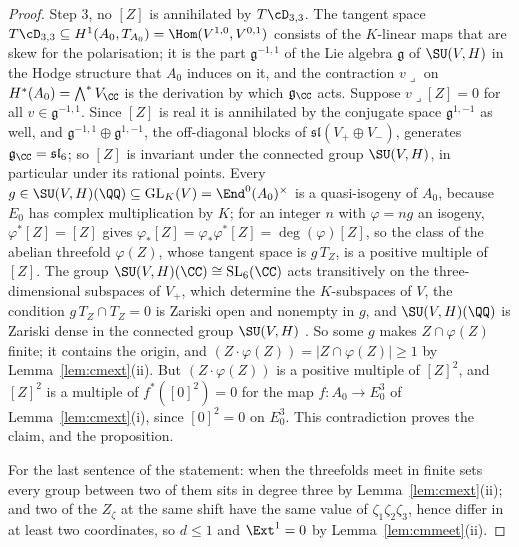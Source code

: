 \begin{proof}
Step 3, no $[Z]$ is annihilated by $T\cD_{3,3}$. The tangent space $T\cD_{3,3}\subseteq H^{1}(A_{0},T_{A_{0}})=\Hom(V^{1,0},V^{0,1})$ consists of the $K$-linear maps that are skew for the polarisation; it is the part $\mathfrak{g}^{-1,1}$ of the Lie algebra $\mathfrak{g}$ of $\SU(V,H)$ in the Hodge structure that $A_{0}$ induces on it, and the contraction $v\lrcorner$ on $H^{*}(A_{0})=\bigwedge^{*}V_{\CC}$ is the derivation by which $\mathfrak{g}_{\CC}$ acts. Suppose $v\lrcorner[Z]=0$ for all $v\in\mathfrak{g}^{-1,1}$. Since $[Z]$ is real it is annihilated by the conjugate space $\mathfrak{g}^{1,-1}$ as well, and $\mathfrak{g}^{-1,1}\oplus\mathfrak{g}^{1,-1}$, the off-diagonal blocks of $\mathfrak{sl}(V_{+}\oplus V_{-})$, generates $\mathfrak{g}_{\CC}=\mathfrak{sl}_{6}$; so $[Z]$ is invariant under the connected group $\SU(V,H)$, in particular under its rational points. Every $g\in\SU(V,H)(\QQ)\subseteq\mathrm{GL}_{K}(V)=\End^{0}(A_{0})^{\times}$ is a quasi-isogeny of $A_{0}$, because $E_{0}$ has complex multiplication by $K$; for an integer $n$ with $\varphi=ng$ an isogeny, $\varphi^{*}[Z]=[Z]$ gives $\varphi_{*}[Z]=\varphi_{*}\varphi^{*}[Z]=\deg(\varphi)[Z]$, so the class of the abelian threefold $\varphi(Z)$, whose tangent space is $g\,T_{Z}$, is a positive multiple of $[Z]$. The group $\SU(V,H)(\CC)\cong\mathrm{SL}_{6}(\CC)$ acts transitively on the three-dimensional subspaces of $V_{+}$, which determine the $K$-subspaces of $V$, the condition $g\,T_{Z}\cap T_{Z}=0$ is Zariski open and nonempty in $g$, and $\SU(V,H)(\QQ)$ is Zariski dense in the connected group $\SU(V,H)$ \cite[Cor.~18.3]{Bor91}. So some $g$ makes $Z\cap\varphi(Z)$ finite; it contains the origin, and $(Z\cdot\varphi(Z))=|Z\cap\varphi(Z)|\ge1$ by Lemma~\ref{lem:cmext}(ii). But $(Z\cdot\varphi(Z))$ is a positive multiple of $[Z]^{2}$, and $[Z]^{2}$ is a multiple of $f^{*}([0]^{2})=0$ for the map $f\colon A_{0}\to E_{0}^{3}$ of Lemma~\ref{lem:cmext}(i), since $[0]^{2}=0$ on $E_{0}^{3}$. This contradiction proves the claim, and the proposition.

For the last sentence of the statement: when the threefolds meet in finite sets every group between two of them sits in degree three by Lemma~\ref{lem:cmext}(ii); and two of the $Z_{\zeta}$ at the same shift have the same value of $\zeta_{1}\zeta_{2}\zeta_{3}$, hence differ in at least two coordinates, so $d\le1$ and $\Ext^{1}=0$ by Lemma~\ref{lem:cmmeet}(ii).
\end{proof}

